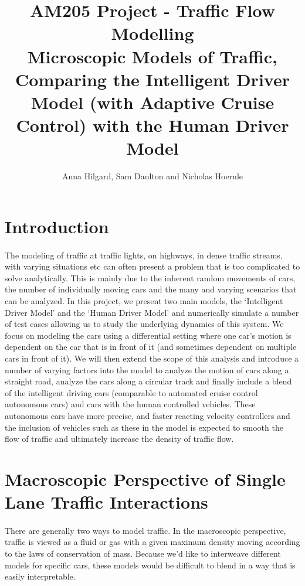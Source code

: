 \documentclass[12pt]{article}
\title{AM205 Project - Traffic Flow Modelling\\
\Large{Microscopic Models of Traffic, Comparing the Intelligent Driver Model (with Adaptive Cruise Control) with the Human Driver Model}}
\author
{Anna Hilgard, Sam Daulton and Nicholas Hoernle}
\date{}
\begin{document}

\maketitle

\section{Introduction}

\paragraph{}
The modeling of traffic at traffic lights, on highways, in dense traffic streams, with varying situations etc can often present a problem that is too complicated to solve analytically. This is mainly due to the inherent random movements of cars, the number of individually moving cars and the many and varying scenarios that can be analyzed.
In this project, we present two main models, the `Intelligent Driver Model' and the `Human Driver Model' and numerically simulate a number of test cases allowing us to study the underlying dynamics of this system. We focus on modeling the cars using a differential setting where one car's motion is dependent on the car that is in front of it (and sometimes dependent on multiple cars in front of it). We will then extend the scope of this analysis and introduce a number of varying factors into the model to analyze the motion of cars along a straight road, analyze the cars along a circular track and finally include a blend of the intelligent driving cars (comparable to automated cruise control autonomous cars) and cars with the human controlled vehicles. These autonomous cars have more precise, and faster reacting velocity controllers and the inclusion of vehicles such as these in the model is expected to smooth the flow of traffic and ultimately increase the density of traffic flow.

\section{Macroscopic Perspective of Single Lane Traffic Interactions}
\paragraph{}There are generally two ways to model traffic. In the macroscopic perspective, traffic is viewed as a fluid or gas with a given maximum density moving according to the laws of conservation of mass. Because we'd like to interweave different models for specific cars, these models would be difficult to blend in a way that is easily interpretable.
\end{document}

